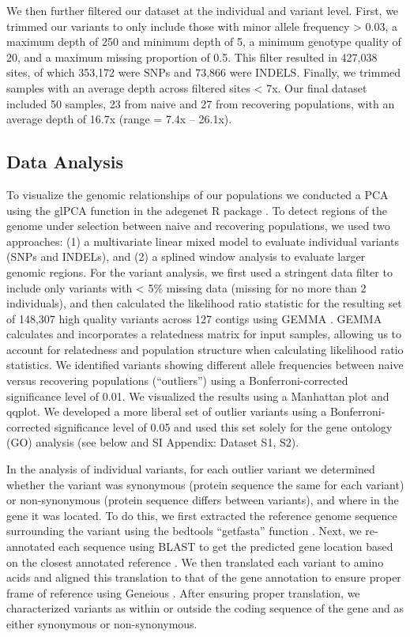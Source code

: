 \documentclass[9pt,twocolumn,twoside,lineno]{pnas-new}
\begin{document}
{We then further filtered our dataset at the individual and variant
level. First, we trimmed our variants to only include those with minor
allele frequency \textgreater{} 0.03, a maximum depth of 250 and minimum
depth of 5, a minimum genotype quality of 20, and a maximum missing
proportion of 0.5. This filter resulted in 427,038 sites, of which
353,172 were SNPs and 73,866 were INDELS. Finally, we trimmed samples
with an average depth across filtered sites \textless{} 7x. Our final
dataset included 50 samples, 23 from naive and 27 from recovering
populations, with an average depth of 16.7x (range = 7.4x -- 26.1x).

\hypertarget{data-analysis}{%
\subsection*{Data Analysis}\label{data-analysis}}

To visualize the genomic relationships of our populations we conducted a
PCA using the glPCA function in the adegenet R package
\citep{jombart2008}. To detect regions of the genome under selection
between naive and recovering populations, we used two approaches: (1) a
multivariate linear mixed model to evaluate individual variants (SNPs
and INDELs), and (2) a splined window analysis to evaluate larger
genomic regions. For the variant analysis, we first used a stringent
data filter to include only variants with \textless{} 5\% missing data
(missing for no more than 2 individuals), and then calculated the
likelihood ratio statistic for the resulting set of 148,307 high quality
variants across 127 contigs using GEMMA \citep{zhou2014}. GEMMA
calculates and incorporates a relatedness matrix for input samples,
allowing us to account for relatedness and population structure when
calculating likelihood ratio statistics. We identified variants showing
different allele frequencies between naive versus recovering populations
(``outliers'') using a Bonferroni-corrected significance level of 0.01.
We visualized the results using a Manhattan plot and qqplot. We
developed a more liberal set of outlier variants using a
Bonferroni-corrected significance level of 0.05 and used this set solely
for the gene ontology (GO) analysis (see below and SI Appendix: Dataset
S1, S2).

In the analysis of individual variants, for each outlier variant we
determined whether the variant was synonymous (protein sequence the same
for each variant) or non-synonymous (protein sequence differs between
variants), and where in the gene it was located. To do this, we first
extracted the reference genome sequence surrounding the variant using
the bedtools ``getfasta'' function \citep{quinlan2010}. Next, we
re-annotated each sequence using BLAST to get the predicted gene
location based on the closest annotated reference \citep{altschul1997}.
We then translated each variant to amino acids and aligned this
translation to that of the gene annotation to ensure proper frame of
reference using Geneious \citep{kearse2012}. After ensuring proper
translation, we characterized variants as within or outside the coding
sequence of the gene and as either synonymous or non-synonymous.

}
\end{document}
